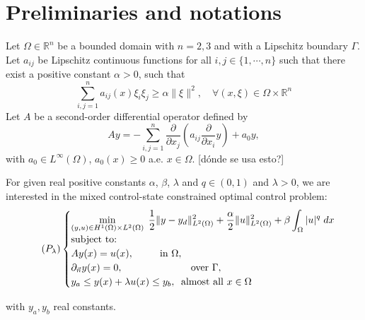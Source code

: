\documentclass[11pt,a4paper]{amsart}
\renewcommand{\l}{\left}
\renewcommand{\r}{\right}
\newcommand{\om}{\Omega}
\newcommand{\reals}{\mathbb{R}}
\newcommand{\norm}[1]{\lVert #1 \rVert}
\begin{document}
 \section{Preliminaries and notations}
Let $\om \in \reals^{n}$ be a bounded domain with $n=2, 3$ and with a Lipschitz boundary $\Gamma$. Let  $a_{ij}$ be Lipschitz continuous functions for all $i,j\in \{1,\cdots,n\}$  such that there exist a positive constant $\alpha>0$, such that
\begin{equation}\label{pdecondition}
    \sum_{i,j=1}^{n}a_{ij}(x)\xi_{i}\xi_{j} \ge \alpha\norm{\xi}^2, \quad \forall  (x,\xi)\in \om\times\reals^n
\end{equation}
Let $A$ be a second-order differential operator defined by
\[
    Ay=-\sum_{i,j=1}^{n}\dfrac{\partial}{\partial x_j}\l(a_{ij} \dfrac{\partial}{\partial x_i}y\r)+a_0y,
\]
with {\color{red}$a_0\in L^{\infty}(\om)$, $a_0(x)\ge 0$ a.e. $x\in \om$. [dónde se usa esto?]}

For given real positive constants  $\alpha$, $\beta$, $\lambda$ and $q\in (0,1)$ and $\lambda>0$, we are interested in the mixed control-state constrained optimal control problem:
\begin{equation}\label{plambda}\tag{$P_{\lambda}$}
    \begin{cases}
    \displaystyle\min_{(y,u)\in H^1(\om)\times L^2(\om)}\; \frac{1}{2}\norm{y-y_d}^2_{L^2(\om)}+\frac{\alpha}{2}\norm{u}^2_{L^2(\om)}+\beta \int_{\om} |u|^{q}\; dx\\
    \mbox{subject to:}\\
    Ay(x)=u(x), \phantom{aaaaa} \mbox{in } \om,\\
    \partial_{\Vec{n}}y(x)=0, \phantom{aaaaaaaaaaaaa} \mbox{over } \Gamma,\\    
    y_a\le y(x)+\lambda u(x)\le y_b,\phantom{a} \mbox{almost all }x\in \Omega
    \end{cases}
\end{equation}

with $y_a, y_b$ real constants. 
\end{document}
